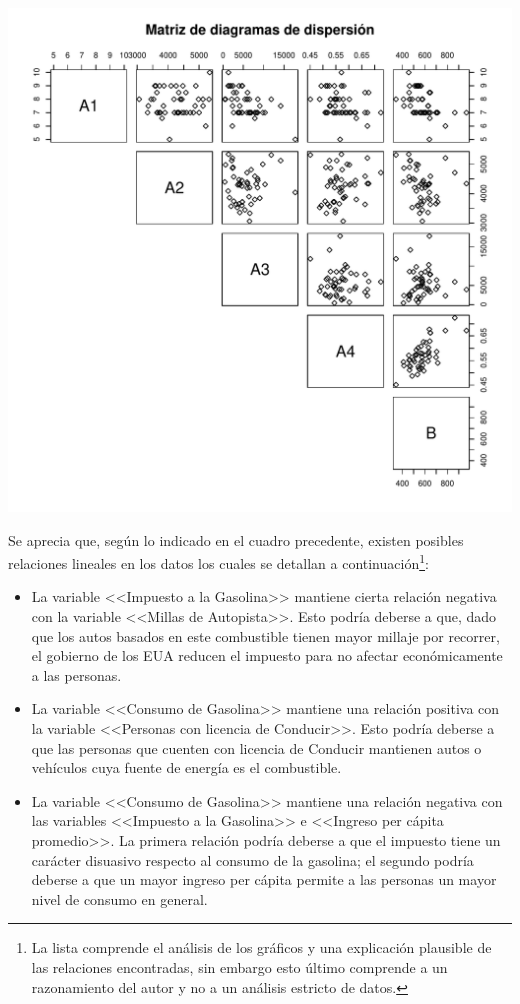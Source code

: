 \documentclass[a4paper,10pt]{article}\usepackage[]{graphicx}\usepackage[]{color}
\makeatletter
\def\maxwidth{ %
  \ifdim\Gin@nat@width>\linewidth
    \linewidth
  \else
    \Gin@nat@width
  \fi
}
\makeatother
\begin{document}
\includegraphics[width=\maxwidth]{figure/unnamed-chunk-2-1} 


Se aprecia que, según lo indicado en el cuadro precedente, existen posibles relaciones lineales en los datos los cuales se detallan a continuación\footnote{La lista comprende el análisis de los gráficos y una explicación plausible de las relaciones encontradas, sin embargo esto último comprende a un razonamiento del autor y no a un análisis estricto de datos.}:

\begin{itemize}
  \item La variable <<Impuesto a la Gasolina>> mantiene cierta relación negativa con la variable <<Millas de Autopista>>. Esto podría deberse a que, dado que los autos basados en este combustible tienen mayor millaje por recorrer, el gobierno de los EUA reducen el impuesto para no afectar económicamente a las personas.
  \item La variable <<Consumo de Gasolina>> mantiene una relación positiva con la variable <<Personas con licencia de Conducir>>. Esto podría deberse a que las personas que cuenten con licencia de Conducir mantienen autos o vehículos cuya fuente de energía es el combustible.
  \item La variable <<Consumo de Gasolina>> mantiene una relación negativa con las variables <<Impuesto a la Gasolina>> e <<Ingreso per cápita promedio>>. La primera relación podría deberse a que el impuesto tiene un carácter disuasivo respecto al consumo de la gasolina; el segundo podría deberse a que un mayor ingreso per cápita permite a las personas un mayor nivel de consumo en general.
\end{itemize}
\end{document}

